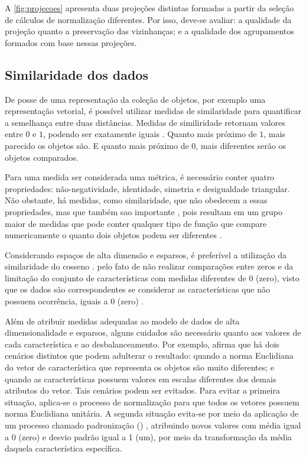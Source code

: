			A \cref{fig:projecoes} apresenta duas projeções distintas formadas a partir da
			seleção de cálculos de normalização diferentes. Por isso, deve-se avaliar: a
			qualidade da projeção quanto a preservação das vizinhanças; e a qualidade dos
			agrupamentos formados com base nessas projeções.

			
		\subsection{Similaridade dos dados}
		\label{subsec:similaridade}
			De posse de uma representação da coleção de objetos, por exemplo uma representação
			vetorial, é possível utilizar medidas de similaridade para quantificar a semelhança
			entre duas distâncias. Medidas de similiridade retornam valores entre $0$ e $1$,
			podendo ser exatamente iguais \cite{Alencar}. Quanto mais próximo de $1$, mais
			parecido os objetos são. E quanto mais próximo de $0$, mais diferentes serão os objetos
			comparados.
			
			Para uma medida ser considerada uma métrica, é necessário conter quatro propriedades:
			não-negatividade, identidade, simetria e desigualdade triangular. Não obstante, há
			medidas, como similaridade, que não obedecem a essas propriedades, mas que também
			sao importante \cite{phd:paulovich}, pois resultam em um grupo maior de medidas que
			pode conter qualquer tipo de função que compare numericamente o quanto dois objetos
			podem ser diferentes \cite{Tan:2005:IDM:1095618}.
			
			Considerando espaços de alta dimensão e esparsos, é preferível a utilização da
			similaridade do cosseno \cite{phd:paulovich}. pelo fato de não realizar
			comparações entre zeros e da limitação do conjunto de características com
			medidas diferentes de 0 (zero), visto que os dados são correspondentes se
			considerar as características que não possuem ocorrência, iguais a $0$
			(zero) \cite{Tan:2005:IDM:1095618,phd:paulovich}.

			
			Além de atribuir medidas adequadas ao modelo de dados de alta dimensionalidade
			e esparsos, alguns cuidados são necessário quanto aos valores de cada
			característica e ao desbalanceamento. Por exemplo, 
			afirma que há dois cenários distintos que podem adulterar o resultado: quando
			a norma Euclidiana do vetor de característica que representa os objetos são
			muito diferentes; e quando as características possuem valores em escalas
			diferentes dos demais atributos do vetor. Tais cenários podem ser evitados.
			Para evitar a primeira situação, aplica-se o processo de normalização para
			que todos os vetores possuem norma Euclidiana unitária. A segunda situação
			evita-se por meio da aplicação de um processo chamado padronização
			() \cite{Tan:2005:IDM:1095618}, atribuindo novos
			valores com média igual a 0 (zero) e desvio padrão igual a 1 (um), por meio
			da transformação da média daquela característica específica.
			
